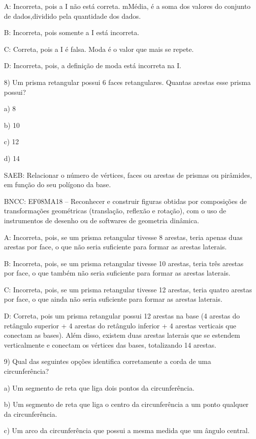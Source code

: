 A: Incorreta, pois a I não está correta. mMédia, é a soma dos valores do
conjunto de dados,dividido pela quantidade dos dados.

B: Incorreta, pois somente a I está incorreta.

C: Correta, pois a I é falsa. Moda é o valor que mais se repete.

D: Incorreta, pois, a definição de moda está incorreta na I.

8) Um prisma retangular possui 6 faces retangulares. Quantas arestas
esse prisma possui?

a) 8

b) 10

c) 12

d) 14

SAEB: Relacionar o número de vértices, faces ou arestas de prismas ou
pirâmides, em função do seu polígono da base.

BNCC: EF08MA18 -- Reconhecer e construir figuras obtidas por composições
de transformações geométricas (translação, reflexão e rotação), com o
uso de instrumentos de desenho ou de softwares de geometria dinâmica.

A: Incorreta, pois, se um prisma retangular tivesse 8 arestas, teria
apenas duas arestas por face, o que não seria suficiente para formar as
arestas laterais.

B: Incorreta, pois, se um prisma retangular tivesse 10 arestas, teria
três arestas por face, o que também não seria suficiente para formar as
arestas laterais.

C: Incorreta, pois, se um prisma retangular tivesse 12 arestas, teria
quatro arestas por face, o que ainda não seria suficiente para formar as
arestas laterais.

D: Correta, pois um prisma retangular possui 12 arestas na base (4
arestas do retângulo superior + 4 arestas do retângulo inferior + 4
arestas verticais que conectam as bases). Além disso, existem duas
arestas laterais que se estendem verticalmente e conectam os vértices
das bases, totalizando 14 arestas.

9) Qual das seguintes opções identifica corretamente a corda de uma
circunferência?

a) Um segmento de reta que liga dois pontos da circunferência.

b) Um segmento de reta que liga o centro da circunferência a um ponto
qualquer da circunferência.

c) Um arco da circunferência que possui a mesma medida que um ângulo
central.

